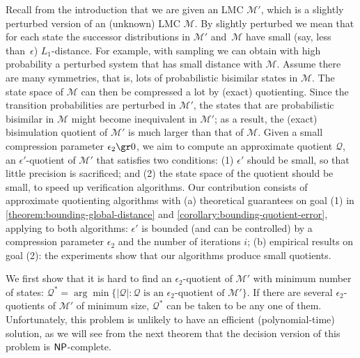 \documentclass[a4paper,UKenglish,cleveref,autoref,thm-restate]{lipics-v2021}
\newcommand{\M}{\mathcal{M}}
\newcommand{\Hyp}{\mathcal{M}'}%
\newcommand{\errorParam}{\epsilon_2}%
\newcommand{\Q}{\mathcal{Q}}
\newcommand{\modify}[1]{{\color{black}#1}}
\begin{document}
Recall from the introduction that we are given an LMC $\Hyp$, which is a slightly perturbed version of an (unknown) LMC $\M$. By slightly perturbed we mean that for each state the successor distributions in $\Hyp$ and~$\M$ have small (say, less than~$\epsilon$) $L_1$-distance. For example, with sampling we can obtain with high probability a perturbed system that has small distance with $\M$. Assume there are many symmetries, that is, lots of probabilistic bisimilar states in $\M$. The state space of $\M$ can then be compressed a lot by (exact) quotienting. Since the transition probabilities are perturbed in $\Hyp$, the states that are probabilistic bisimilar in $\M$ might become inequivalent in $\Hyp$; as a result, the (exact) bisimulation quotient of $\Hyp$ is much larger than that of $\M$. Given a small compression parameter $\errorParam \gr 0$, we aim to compute an approximate quotient $\Q$, an $\epsilon'$-quotient of $\Hyp$ that satisfies two conditions: \modify{(1) $\epsilon'$ should be small, so that little precision is
sacrificed; and (2) the state space of the quotient should be small, to speed up
verification algorithms. Our contribution consists of approximate quotienting algorithms with (a) theoretical guarantees on goal (1) in \cref{theorem:bounding-global-distance} and
\cref{corollary:bounding-quotient-error}, applying to both algorithms: $\epsilon'$ is bounded (and can be controlled) by a compression parameter $\epsilon_2$ and
the number of iterations $i$; (b) empirical results on goal (2): the experiments show that our algorithms produce small quotients.} %

We first show that it is hard to find an $\errorParam$-quotient of $\Hyp$ with minimum number of states: $\Q^{*}= \arg\min\{|\Q| : \Q \text{ is an } \errorParam\text{-quotient of }\Hyp\}.$ If there are several $\errorParam$-quotients of $\Hyp$ of minimum size, $\Q^{*}$ can be taken to be any one of them. Unfortunately, this problem is unlikely to have an efficient (polynomial-time) solution, as we will see from the next theorem that the decision version of this problem is $\sf NP$-complete.
\end{document}
